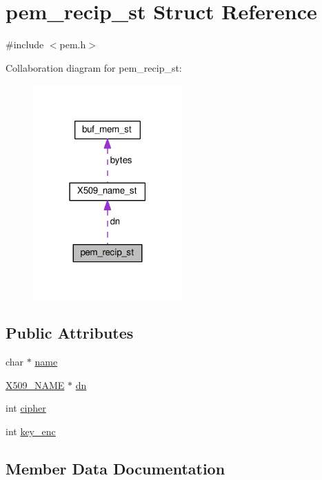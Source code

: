 \hypertarget{structpem__recip__st}{}\section{pem\+\_\+recip\+\_\+st Struct Reference}
\label{structpem__recip__st}


{\ttfamily \#include $<$pem.\+h$>$}



Collaboration diagram for pem\+\_\+recip\+\_\+st\+:
\nopagebreak
\begin{figure}[H]
\begin{center}
\leavevmode
\includegraphics[width=162pt]{structpem__recip__st__coll__graph}
\end{center}
\end{figure}
\subsection*{Public Attributes}
\begin{DoxyCompactItemize}
\item 
char $\ast$ \hyperlink{structpem__recip__st_a01cd4e55a392b7bc9c91f543800a7347}{name}
\item 
\hyperlink{ossl__typ_8h_a5c5fc036757e87b9bd163d0221696533}{X509\+\_\+\+N\+A\+ME} $\ast$ \hyperlink{structpem__recip__st_a7087e450cc6060c055c430535b0df70e}{dn}
\item 
int \hyperlink{structpem__recip__st_aacc99505c76644287f2b94c986349f16}{cipher}
\item 
int \hyperlink{structpem__recip__st_a10d41030c038defd986f740d1663b831}{key\+\_\+enc}
\end{DoxyCompactItemize}


\subsection{Member Data Documentation}
